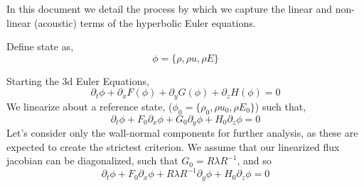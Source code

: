 \documentclass[letterpaper,11pt,nointlimits,reqno]{amsart}
\begin{document}
In this document we detail the process by which we capture the linear
and non-linear (acoustic) terms of the hyperbolic Euler equations. 

Define state as,
\begin{equation}
 \phi = \{\rho, \rho u, \rho E \}
\end{equation}

Starting the 3d Euler Equations,
\begin{equation}
 \partial_t \phi + \partial_x F(\phi) + \partial_y G(\phi) + \partial_z
  H(\phi) = 0 
\end{equation}
We linearize about a reference state, ($\phi_0 = \{\rho_0, \rho u_0,
\rho E_0 \}$) such that,
\begin{equation}
 \partial_t \phi +  F_0 \partial_x \phi + G_0 \partial_y \phi + H_0 \partial_z
  \phi = 0 
\end{equation}
Let's consider only the wall-normal components for further analysis, as
these are expected to create the strictest criterion. We assume that our
linearized flux jacobian can be diagonalized, such that $G_0 = R \lambda
R^{-1}$, and so
\begin{equation}
 \partial_t \phi +  F_0 \partial_x \phi + R \lambda R^{-1} \partial_y \phi + H_0 \partial_z
  \phi = 0 
\end{equation}
\end{document}
